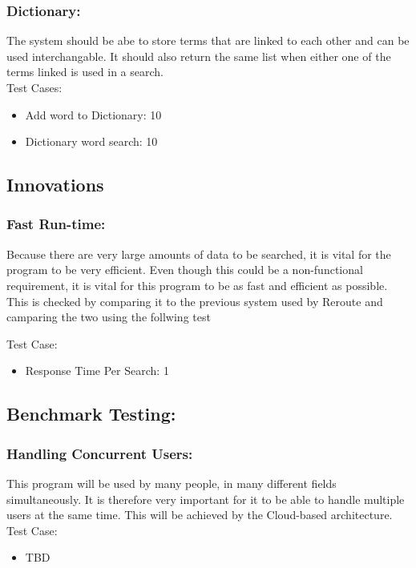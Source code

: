 \documentclass[11pt]{article}
\begin{document}
	\subsubsection{Dictionary: }
	The system should be abe to store terms that are linked to each other and can be used interchangable. It should also return the same list when either one of the terms linked is used in a search.\\
	Test Cases:
	 \begin{itemize}
	 \item Add word to Dictionary: 10
	 \item Dictionary word search: 10
        \end{itemize}
	
	\subsection{Innovations}
	\subsubsection{Fast Run-time:}
Because there are very large amounts of data to be searched, it is vital for the program to be very
efficient. Even though this could be a non-functional requirement, it is vital for this program to be as fast
and efficient as possible. This is checked by comparing it to the previous system used by Reroute and camparing the two using the follwing test

	Test Case:
	\begin{itemize}	
        \item Response Time Per Search: 1 
         \end{itemize}
         
	\subsection{Benchmark Testing:}

	\subsubsection{Handling Concurrent Users:}
This program will be used by many people, in many different fields simultaneously. It is therefore very important for it to be able to handle multiple users at the same time. This will be achieved by the Cloud-based architecture.	
	Test Case:
	\begin{itemize}
        	\item TBD 
       \end{itemize}
\end{document}
